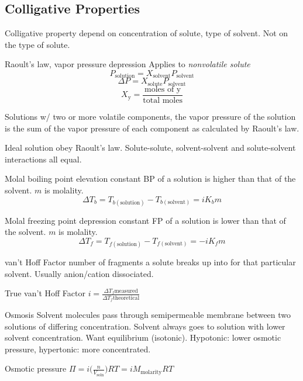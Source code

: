 \begin{mdframed}\subsection{Colligative Properties}
\begin{multicols}{2}\begin{compactdesc}
    \item[Colligative property] depend on concentration of solute, type of
        solvent. Not on the type of solute.
    \item[Raoult's law, vapor pressure depression]
        Applies to \emph{nonvolatile solute}
        \[
            P_\text{solution} = X_\text{solvent} P_\text{solvent}
        \]
        \[
            \Delta P = X_\text{solute} P_\text{solvent}
        \]
        \[
            X_\text{y} = \frac{\text{moles of y}}{\text{total moles}}
        \]
    \item[Solutions w/ two or more volatile] components, the vapor pressure of
        the solution is the sum of the vapor pressure of each component as
        calculated by Raoult's law.
    \item[Ideal solution] obey Raoult's law. Solute-solute, solvent-solvent and
        solute-solvent interactions all equal.
    \item[Molal boiling point elevation constant] BP of a solution is
        higher than that of the solvent. $m$ is molality.
        \[
            \Delta T_b = T_{b(\text{solution})} - T_{b(\text{solvent})}
            = i K_b m
        \]
    \item[Molal freezing point depression constant] FP of a solution is lower
        than that of the solvent. $m$ is molality.
        \[
            \Delta T_f = T_{f(\text{solution})} - T_{f(\text{solvent})}
            = - i K_f m
        \]
    \item[van't Hoff Factor] number of fragments a solute breaks up into for
        that particular solvent. Usually anion/cation dissociated.
    \item[True van't Hoff Factor] $i = \frac
        {\Delta T_f \text{measured}}
        {\Delta T_f \text{theoretical}}$
    \item[Osmosis] Solvent molecules pass through semipermeable membrane
        between two solutions of differing concentration. Solvent always
        goes to solution with lower solvent concentration. Want equilibrium
        (isotonic). Hypotonic: lower osmotic pressure, hypertonic: more
        concentrated.
    \item[Osmotic pressure] $\Pi = i \big( \frac{n}{V_\text{soln}} \big) RT
                                 = iM_\text{molarity}RT$
\end{compactdesc}\end{multicols}\end{mdframed}


